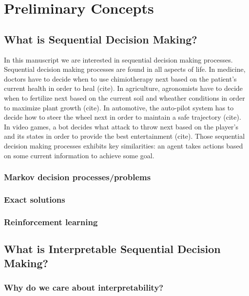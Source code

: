 \chapter*{Preliminary Concepts}

\section{What is Sequential Decision Making?}
In this manuscript we are interested in sequential decision making processes. Sequential decision making processes are found in all aspects of life. In medicine, {\color{blue}doctors} have to decide when {\color{orange}to use chimiotherapy} next based on {\color{green} the patient's current health} in order {\color{red}to heal} (cite). In agriculture, agronomists have to decide when to fertilize next based on the current soil and wheather conditions in order to maximize plant growth (cite). In automotive, the auto-pilot system has to decide how to steer the wheel next in order to maintain a safe trajectory (cite). In video games, a bot decides what attack to throw next based on the player's and its states in order to provide the best entertainment (cite).
Those sequential decision making processes exhibits key similarities: {\color{blue}an agent} takes {\color{orange}actions} based on {\color{green}some current information} to achieve some {\color{red}goal}. 

\subsection{Markov decision processes/problems}

\subsection{Exact solutions}

\subsection{Reinforcement learning}

\section{What is Interpretable Sequential Decision Making?}

\subsection{Why do we care about interpretability?}


